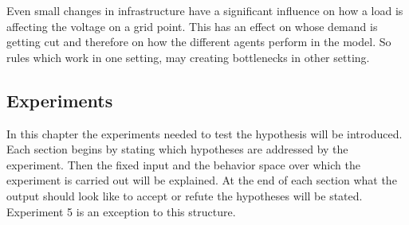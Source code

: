 \documentclass[a4paper]{article}
\begin{document}
\begin{enumerate}
\begin{enumerate}
                                      Even small changes in infrastructure have a significant influence on how
                                      a load is affecting the voltage on a grid point. This has an effect on
                                      whose demand is getting cut and therefore on how the different agents 
                                      perform in the model. So rules which work in one setting, may creating 
                                      bottlenecks in other setting.

                                     \end{enumerate}
\end{enumerate}

\subsection{Experiments}
In this chapter the experiments needed to test the hypothesis will be introduced. Each section begins by stating
which hypotheses are addressed by the experiment. Then the fixed input and the behavior space over which the
experiment is carried out will be explained. At the end of each section what the output should look like to
accept or refute the hypotheses will be stated. Experiment  5 is an exception to this structure.
\end{document}
